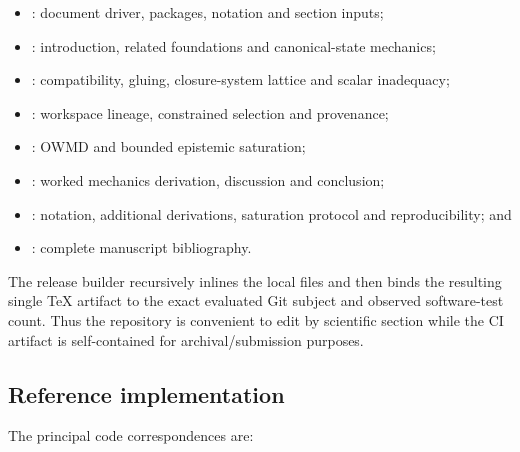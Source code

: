 \documentclass[11pt]{article}
\begin{document}
\begin{itemize}[leftmargin=*]
\item {}: document driver, packages, notation and section inputs;
\item {}: introduction, related foundations and canonical-state mechanics;
\item {}: compatibility, gluing, closure-system lattice and scalar inadequacy;
\item {}: workspace lineage, constrained selection and provenance;
\item {}: OWMD and bounded epistemic saturation;
\item {}: worked mechanics derivation, discussion and conclusion;
\item {}: notation, additional derivations, saturation protocol and reproducibility; and
\item {}: complete manuscript bibliography.
\end{itemize}

The release builder recursively inlines the local \verb|| files and then binds the resulting single TeX artifact to the exact evaluated Git subject and observed software-test count. Thus the repository is convenient to edit by scientific section while the CI artifact is self-contained for archival/submission purposes.

\subsection{Reference implementation}

The principal code correspondences are:
\end{document}
